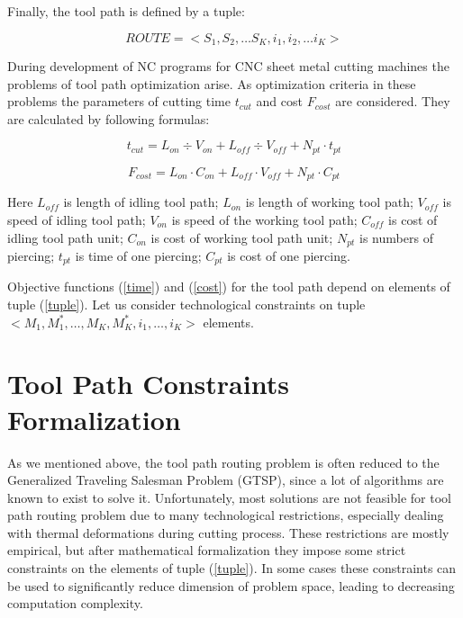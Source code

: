 \documentclass{../download/tPRS2e}
\begin{document}
Finally, the tool path is defined by a tuple:

\begin{equation} \label {tuple}
ROUTE = < S_1, S_2, \dots S_K, i_1, i_2, \dots i_K > 
\end{equation}

During development of NC programs for CNC sheet metal cutting machines the problems of tool path optimization arise.
As optimization criteria in these problems the parameters of cutting time $t_{cut}$ and cost $F_{cost}$ are considered.
They are calculated by following formulas:

\begin{equation} \label{time}
t_{cut} = L_{on} \div V_{on} + L_{off} \div V_{off} + N_{pt} \cdot t_{pt}
\end{equation}

\begin{equation} \label {cost}
F_{cost} = L_{on} \cdot C_{on} + L_{off} \cdot V_{off} + N_{pt} \cdot C_{pt}
\end{equation}

Here $L_{off}$ is length of idling tool path;
$L_{on}$ is length of working tool path;
$V_{off}$ is speed of idling tool path;
$V_{on}$ is speed of the working tool path;
$C_{off}$ is cost of idling tool path unit;
$C_{on}$ is cost of working tool path unit;
$N_{pt}$ is numbers of piercing;
$t_{pt}$ is time of one piercing;
$C_{pt}$ is cost of one piercing.

Objective functions (\ref{time}) and (\ref{cost})
for the tool path depend on elements of tuple (\ref{tuple}).
Let us consider technological constraints on tuple
$<M_1, M_1^*, \dots , M_K, M_K^*, i_1, \dots , i_K>$
elements.

\section{Tool Path Constraints Formalization}

As we mentioned above,
the tool path routing problem is often reduced to the Generalized Traveling Salesman Problem (GTSP),
since a lot of algorithms are known to exist to solve it.
Unfortunately, most solutions are not feasible for tool path routing problem due to many technological restrictions,
especially dealing with thermal deformations during cutting process.
These restrictions are mostly empirical,
but after mathematical formalization they impose some strict constraints on the elements of tuple (\ref{tuple}).
In some cases these constraints can be used to significantly reduce dimension of problem space,
leading to decreasing computation complexity.
\end{document}
